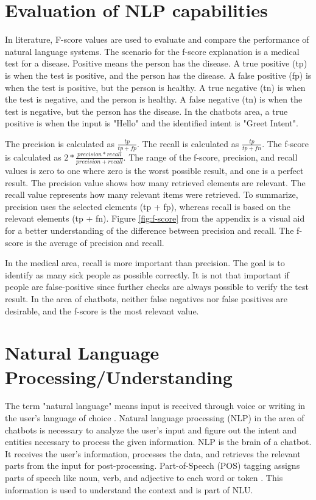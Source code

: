 \section{Evaluation of NLP capabilities}
In literature, F-score values are used to evaluate and compare the performance of natural language systems.
The scenario for the f-score explanation is a medical test for a disease.
Positive means the person has the disease.
A true positive (tp) is when the test is positive, and the person has the disease.
A false positive (fp) is when the test is positive, but the person is healthy.
A true negative (tn) is when the test is negative, and the person is healthy.
A false negative (tn) is when the test is negative, but the person has the disease.
In the chatbots area, a true positive is when the input is "Hello" and the identified intent is "Greet Intent".

The precision is calculated as $\frac{tp}{tp + fp}$.
The recall is calculated as $\frac{tp}{tp + fn}$.
The f-score is calculated as $2 * \frac{precision * recall}{precision + recall}$.
The range of the f-score, precision, and recall values is zero to one where zero is the worst possible result, and one is a perfect result.
The precision value shows how many retrieved elements are relevant.
The recall value represents how many relevant items were retrieved.
To summarize, precision uses the selected elements (tp + fp), whereas recall is based on the relevant elements (tp + fn).
Figure \ref{fig:f-score} from the appendix is a visual aid for a better understanding of the difference between precision and recall.
The f-score is the average of precision and recall.

In the medical area, recall is more important than precision.
The goal is to identify as many sick people as possible correctly.
It is not that important if people are false-positive since further checks are always possible to verify the test result.
In the area of chatbots, neither false negatives nor false positives are desirable, and the f-score is the most relevant value.


\section{Natural Language Processing/Understanding}   
The term "natural language" means input is received through voice or writing in the user's language of choice \cite{buiildChatbotsPython}.
Natural language processing (NLP) in the area of chatbots is necessary to analyze the user's input and figure out the intent and entities necessary to process the given information. 
NLP is the brain of a chatbot.
It receives the user's information, processes the data, and retrieves the relevant parts from the input for post-processing.
Part-of-Speech (POS) tagging assigns parts of speech like noun, verb, and adjective to each word or token \cite{buiildChatbotsPython}.
This information is used to understand the context and is part of NLU.

